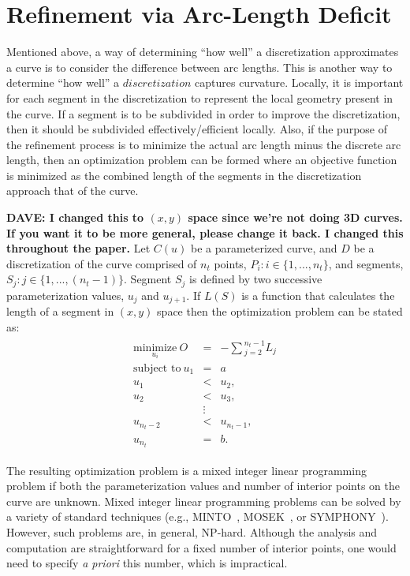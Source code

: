 \section{Refinement via Arc-Length Deficit}
Mentioned above, a way of determining ``how well'' a discretization 
approximates a curve is to consider the difference between arc lengths. 
This is another way to determine ``how well'' a $discretization$ captures curvature. Locally, it is important for each segment in the discretization to represent the local geometry present in the curve. If a segment is to be subdivided in order to improve the discretization, then it should be subdivided 
effectively/efficient locally.
Also, if the purpose of the refinement process is to minimize the actual arc length minus the discrete arc length, then an optimization problem can be formed where an objective function is minimized as the combined length of the segments in the discretization approach that of the curve.

{\bf{DAVE:  I changed this to $(x,y)$ space since we're not doing 3D 
curves.  If you want it to be more general, please change it back.  I 
changed this throughout the paper.}}
Let $C(u)$ be a parameterized curve, and $D$ be a discretization of the 
curve comprised of $n_t$ points, $P_i : i \in \{1,...,n_t\}$, and 
segments, $S_j : j \in \{1,...,(n_t-1)\}$. Segment $S_j$ is defined by two successive parameterization values, $u_j$ and $u_{j+1}$. If $L(S)$ is a function that calculates the length of a segment in $(x,y)$ space then the optimization problem can be stated as:
\begin{eqnarray*}
\begin{array}{rcl}
\underset{u_i}{\text{minimize}} \ O & = & -\sum{_{j=2}^{n_t-1}L_j} \\
\text{subject to} \ u_1 & = & a \\
u_1 & < & u_2, \\ 
u_2 & < & u_3, \\
& \vdots & \\
u_{n_t-2} & < & u_{n_t-1},\\ 
u_{n_t} & = & b.
\end{array}
\end{eqnarray*}

The resulting optimization problem is a mixed integer linear programming 
problem if both the parameterization values and number of interior points 
on the curve are unknown.  Mixed integer linear programming problems can 
be solved by a variety of standard techniques (e.g., MINTO~\cite{minto}, 
MOSEK~\cite{mosek}, or SYMPHONY~\cite{symphony}).  However, such problems 
are, in general, NP-hard.  
Although the analysis and computation are straightforward for a fixed 
number of interior points, one would need to specify {\it{a priori}} this 
number, which is impractical.

